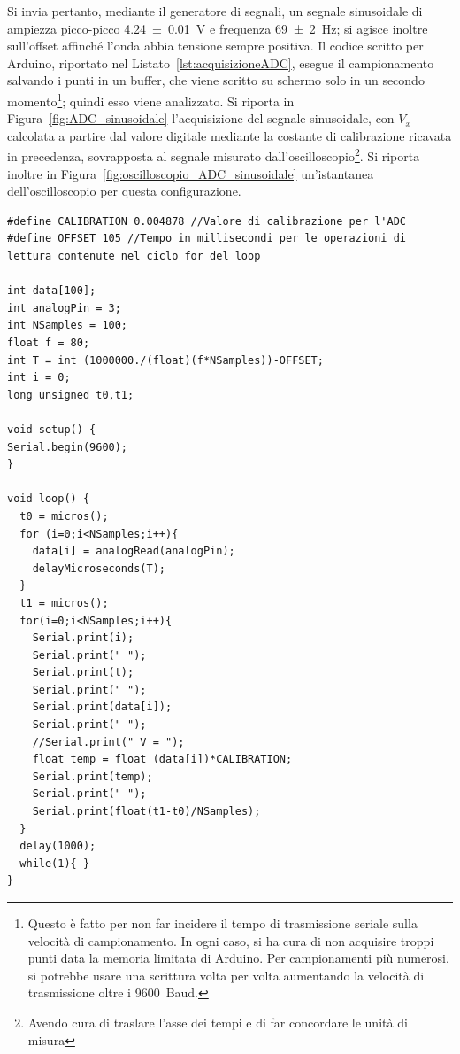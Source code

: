 \documentclass[10pt,oneside,a4paper]{article}
\begin{document}
\begin{multicols}{2}
Si invia pertanto, mediante il generatore di segnali, un segnale sinusoidale di ampiezza picco-picco \SI{4.24 \pm 0.01}{V} e frequenza \SI{69 \pm 2}{\Hz}; si agisce inoltre sull'offset affinché l'onda abbia tensione sempre positiva. Il codice scritto per Arduino, riportato nel Listato~\ref{lst:acquisizioneADC}, esegue il campionamento salvando i punti in un buffer, che viene scritto su schermo solo in un secondo momento\footnote{Questo è fatto per non far incidere il tempo di trasmissione seriale sulla velocità di campionamento. In ogni caso, si ha cura di non acquisire troppi punti data la memoria limitata di Arduino. Per campionamenti più numerosi, si potrebbe usare una scrittura volta per volta aumentando la velocità di trasmissione oltre i \SI{9600}{Baud}.}; quindi esso viene analizzato. Si riporta in Figura~\ref{fig:ADC_sinusoidale} l'acquisizione del segnale sinusoidale, con $V_x$ calcolata a partire dal valore digitale mediante la costante di calibrazione ricavata in precedenza, sovrapposta al segnale misurato dall'oscilloscopio\footnote{Avendo cura di traslare l'asse dei tempi e di far concordare le unità di misura}. Si riporta inoltre in Figura~\ref{fig:oscilloscopio_ADC_sinusoidale} un'istantanea dell'oscilloscopio per questa configurazione.

\begin{lstlisting}[style=CStyle, caption={Codice per l'acquisizione dall'ADC}, label=lst:acquisizioneADC]
#define CALIBRATION 0.004878 //Valore di calibrazione per l'ADC
#define OFFSET 105 //Tempo in millisecondi per le operazioni di lettura contenute nel ciclo for del loop

int data[100];
int analogPin = 3;
int NSamples = 100;
float f = 80;
int T = int (1000000./(float)(f*NSamples))-OFFSET;
int i = 0;
long unsigned t0,t1;

void setup() {
Serial.begin(9600);
}

void loop() {
  t0 = micros();
  for (i=0;i<NSamples;i++){
    data[i] = analogRead(analogPin);
    delayMicroseconds(T);
  }
  t1 = micros();
  for(i=0;i<NSamples;i++){
    Serial.print(i);
    Serial.print(" ");
    Serial.print(t);
    Serial.print(" ");
    Serial.print(data[i]);
    Serial.print(" ");
    //Serial.print(" V = ");
    float temp = float (data[i])*CALIBRATION;
    Serial.print(temp);
    Serial.print(" ");
    Serial.print(float(t1-t0)/NSamples);
  }
  delay(1000);
  while(1){ }
}
\end{lstlisting}


\end{multicols}
\end{document}
